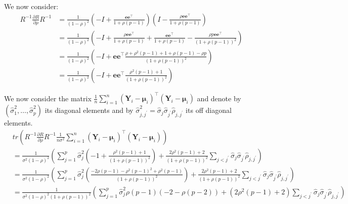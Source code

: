 \documentclass[12pt]{article}
\newcommand\Ve{\mathbf{e}}
\newcommand\VY{\mathbf{Y}}
\newcommand\Vmu{\boldsymbol{\mu}}
\newcommand\trans[1]{{#1}^\intercal}%
\begin{document}
We now consider:
\begin{align*}
R^{-1} \frac{\partial R}{\partial\rho} R^{-1} &= \frac{1}{(1-\rho)^2} \left(-I +  \frac{\Ve\trans{\Ve}}{1+\rho(p-1)}\right)\left(I - \frac{\rho \Ve\trans{\Ve}}{1+\rho(p-1)}\right) \\
&= \frac{1}{(1-\rho)^2} \left(-I + \frac{\rho \Ve\trans{\Ve}}{1+\rho(p-1)} + \frac{\Ve\trans{\Ve}}{1+\rho(p-1)} - \frac{\rho p \Ve\trans{\Ve}}{(1+\rho(p-1))^2}\right) \\
&= \frac{1}{(1-\rho)^2} \left(-I + \Ve\trans{\Ve} \frac{\rho+\rho^2(p-1) + 1+ \rho(p-1) - \rho p}{(1+\rho(p-1))^2}\right) \\
&= \frac{1}{(1-\rho)^2} \left(-I + \Ve\trans{\Ve} \frac{\rho^2(p-1) + 1}{(1+\rho(p-1))^2}\right) 
\end{align*}

We now consider the matrix \(\frac{1}{n}\sum_{i=1}^n \trans{(\VY_i-\Vmu_i)} (\VY_i-\Vmu_i)\) and denote by
\(\left(\widehat{\sigma}^2_1,\ldots,\widehat{\sigma}^2_p\right)\) its
diagonal elements and by
\(\widehat{\sigma}^2_{j,j^{\prime}}=\widehat{\sigma}_j
\widehat{\sigma}_{j^{\prime}}\widehat{\rho}_{j,j^{\prime}}\) its off
diagonal elements.
\begin{align*}
& tr \left( R^{-1} \frac{\partial R}{\partial\rho} R^{-1} \frac{1}{n\sigma^2}\sum_{i=1}^n \trans{(\VY_i-\Vmu_i)} (\VY_i-\Vmu_i) \right) \\
& = \frac{1}{\sigma^2(1-\rho)^2}\left(\sum_{j=1}^p \widehat{\sigma}^2_j\left(-1+\frac{\rho^2(p-1) + 1}{(1+\rho(p-1))^2}\right) + \frac{2\rho^2(p-1) + 2}{(1+\rho(p-1))^2} \sum_{j < j^{\prime}}\widehat{\sigma}_j
\widehat{\sigma}_{j^{\prime}}\widehat{\rho}_{j,j^{\prime}}\right) \\
&= \frac{1}{\sigma^2(1-\rho)^2}\left(\sum_{j=1}^p \widehat{\sigma}^2_j\left(\frac{-2\rho(p-1)-\rho^2(p-1)^2+\rho^2(p-1)}{(1+\rho(p-1))^2}\right) + \frac{2\rho^2(p-1) + 2}{(1+\rho(p-1))^2} \sum_{j < j^{\prime}}\widehat{\sigma}_j
\widehat{\sigma}_{j^{\prime}}\widehat{\rho}_{j,j^{\prime}}\right) \\
&= \frac{1}{\sigma^2(1-\rho)^2(1+\rho(p-1))^2}\left(\sum_{j=1}^p \widehat{\sigma}^2_j \rho(p-1)\left(-2-\rho (p-2)\right) + \left(2\rho^2(p-1) + 2\right) \sum_{j < j^{\prime}}\widehat{\sigma}_j
\widehat{\sigma}_{j^{\prime}}\widehat{\rho}_{j,j^{\prime}}\right)
\end{align*}
\end{document}
